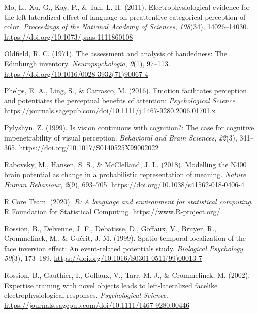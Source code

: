 \documentclass[
  english,
  man,11pt,floatsintext]{apa7}
\begin{document}
\leavevmode\hypertarget{ref-mo2011}{}%
Mo, L., Xu, G., Kay, P., \& Tan, L.-H. (2011). Electrophysiological evidence for the left-lateralized effect of language on preattentive categorical perception of color. \emph{Proceedings of the National Academy of Sciences}, \emph{108}(34), 14026--14030. \url{https://doi.org/10.1073/pnas.1111860108}

\leavevmode\hypertarget{ref-oldfield1971}{}%
Oldfield, R. C. (1971). The assessment and analysis of handedness: The Edinburgh inventory. \emph{Neuropsychologia}, \emph{9}(1), 97--113. \url{https://doi.org/10.1016/0028-3932(71)90067-4}

\leavevmode\hypertarget{ref-phelps2016}{}%
Phelps, E. A., Ling, S., \& Carrasco, M. (2016). Emotion facilitates perception and potentiates the perceptual benefits of attention: \emph{Psychological Science}. \url{https://journals.sagepub.com/doi/10.1111/j.1467-9280.2006.01701.x}

\leavevmode\hypertarget{ref-pylyshyn1999}{}%
Pylyshyn, Z. (1999). Is vision continuous with cognition?: The case for cognitive impenetrability of visual perception. \emph{Behavioral and Brain Sciences}, \emph{22}(3), 341--365. \url{https://doi.org/10.1017/S0140525X99002022}

\leavevmode\hypertarget{ref-rabovsky2018}{}%
Rabovsky, M., Hansen, S. S., \& McClelland, J. L. (2018). Modelling the N400 brain potential as change in a probabilistic representation of meaning. \emph{Nature Human Behaviour}, \emph{2}(9), 693--705. \url{https://doi.org/10.1038/s41562-018-0406-4}

\leavevmode\hypertarget{ref-R-base}{}%
R Core Team. (2020). \emph{R: A language and environment for statistical computing}. R Foundation for Statistical Computing. \url{https://www.R-project.org/}

\leavevmode\hypertarget{ref-rossion1999}{}%
Rossion, B., Delvenne, J. F., Debatisse, D., Goffaux, V., Bruyer, R., Crommelinck, M., \& Guérit, J. M. (1999). Spatio-temporal localization of the face inversion effect: An event-related potentials study. \emph{Biological Psychology}, \emph{50}(3), 173--189. \url{https://doi.org/10.1016/S0301-0511(99)00013-7}

\leavevmode\hypertarget{ref-rossion2002}{}%
Rossion, B., Gauthier, I., Goffaux, V., Tarr, M. J., \& Crommelinck, M. (2002). Expertise training with novel objects leads to left-lateralized facelike electrophysiological responses. \emph{Psychological Science}. \url{https://journals.sagepub.com/doi/10.1111/1467-9280.00446}
\end{document}
